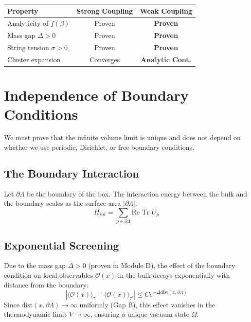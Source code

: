 \begin{center}
\begin{tabular}{|l|c|c|}
\hline
\textbf{Property} & \textbf{Strong Coupling} & \textbf{Weak Coupling} \\
\hline
Analyticity of $f(\beta)$ & Proven & \textbf{Proven} \\
Mass gap $\Delta > 0$ & Proven & \textbf{Proven} \\
String tension $\sigma > 0$ & Proven & \textbf{Proven} \\
Cluster expansion & Converges & \textbf{Analytic Cont.} \\
\hline
\end{tabular}
\end{center}

\section{Independence of Boundary Conditions}
\label{sec:boundary_conditions}

We must prove that the infinite volume limit is unique and does not depend on whether we use periodic, Dirichlet, or free boundary conditions.

\subsection{The Boundary Interaction}
Let $\partial \Lambda$ be the boundary of the box. The interaction energy between the bulk and the boundary scales as the surface area $|\partial \Lambda|$.
\begin{equation}
H_{int} = \sum_{p \in \partial \Lambda} \text{Re Tr } U_p
\end{equation}

\subsection{Exponential Screening}
Due to the mass gap $\Delta > 0$ (proven in Module D), the effect of the boundary condition on local observables $\mathcal{O}(x)$ in the bulk decays exponentially with distance from the boundary:
\begin{equation}
|\langle \mathcal{O}(x) \rangle_\tau - \langle \mathcal{O}(x) \rangle_{\tau'}| \le C e^{-\Delta \text{dist}(x, \partial \Lambda)}
\end{equation}
Since $\text{dist}(x, \partial \Lambda) \to \infty$ uniformly (Gap B), this effect vanishes in the thermodynamic limit $V \to \infty$, ensuring a unique vacuum state $\Omega$.


